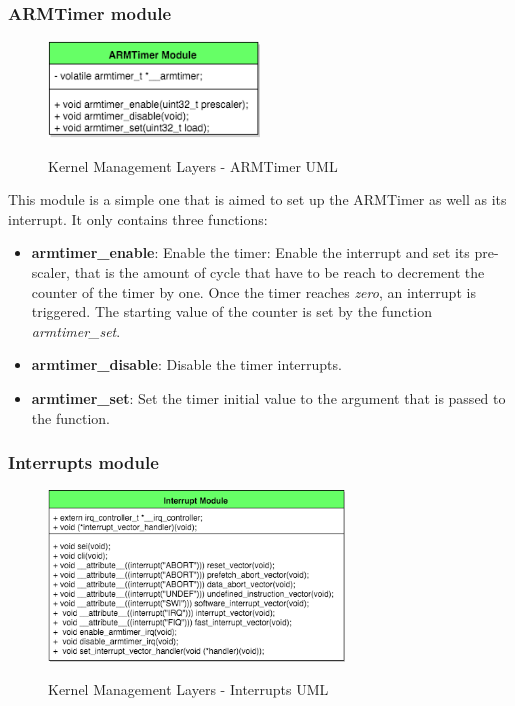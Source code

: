 \subsubsection{ARMTimer module}


\begin{figure}[H]
\begin{center}
\includegraphics[width=0.5\textwidth]{includes/figures/chapter5_kernel_management_layer_ARMTimer_UML.png}  \\
\caption{Kernel Management Layers - ARMTimer UML}
\end{center}
\label{fig:chapter5_kernel_management_layer_ARMTimer_UML}
\end{figure}


This module is a simple one that is aimed to set up the ARMTimer as well as its interrupt. It only contains three functions:
\begin{itemize}
	\item \textbf{armtimer\_enable}: Enable the timer: Enable the interrupt and set its pre-scaler, that is the amount of cycle that have to be reach to decrement the counter of the timer by one. Once the timer reaches \textit{zero}, an interrupt is triggered. The starting value of the counter is set by the function \textit{armtimer\_set}.
	\item \textbf{armtimer\_disable}: Disable the timer interrupts.
	\item \textbf{armtimer\_set}: Set the timer initial value to the argument that is passed to the function. 
\end{itemize}




\subsubsection{Interrupts module}

\begin{figure}[H]
\begin{center}
\includegraphics[width=0.7\textwidth]{includes/figures/chapter5_kernel_management_layer_interrupts_UML.png}  \\[0.5 cm]
\caption{Kernel Management Layers - Interrupts UML}
\end{center}
\label{fig:chapter5_kernel_management_layer_interrupts_UML}
\end{figure}

